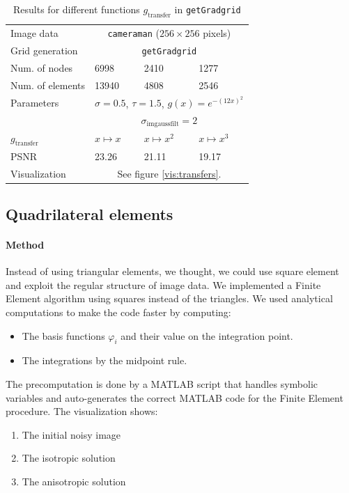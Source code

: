 \documentclass{report}
\renewcommand\phi{\varphi}
\begin{document}
\begin{table}[h]
	\centering
	\begin{tabular}{|llll}
		Image data & \multicolumn{3}{c}{\texttt{cameraman} ($256 \times 256$ pixels)} \\
		Grid generation & \multicolumn{3}{c}{\texttt{getGradgrid}} \\
		Num. of nodes & 6998 & 2410 & 1277 \\
		Num. of elements & 13940 & 4808 & 2546 \\
		Parameters & \multicolumn{3}{c}{$\sigma=0.5$, $\tau=1.5$, $g(x) = e^{-(12 x)^2}$} \\
		& \multicolumn{3}{c}{$\sigma_\text{imgaussfilt}=2$} \\
		$g_\text{transfer}$ & $x \mapsto x$ & $x \mapsto x^2$ & $x \mapsto x^3$ \\
		PSNR & 23.26 & 21.11 & 19.17 \\
		Visualization &  \multicolumn{3}{c}{See figure \ref{vis:transfers}.} \\
	\end{tabular}
	\caption{Results for different functions $g_\text{transfer}$ in \texttt{getGradgrid}}
	\label{res:transfers}
\end{table}

\subsection{Quadrilateral elements}

\paragraph{Method}

Instead of using triangular elements, we thought, we could use square element and exploit the regular structure of image data. We implemented a Finite Element algorithm using squares instead of the triangles. We used analytical computations to make the code faster by computing: 

\begin{itemize}
    \item 
    The basis functions $\phi_i$ and their value on the integration point.
    \item 
    The integrations by the midpoint rule.
\end{itemize}
The precomputation is done by a MATLAB script that handles symbolic variables and auto-generates the correct MATLAB code for the Finite Element procedure. The visualization shows: 
\begin{enumerate}
\item 
The initial noisy image
\item 
The isotropic solution 
\item 
The anisotropic solution
\end{enumerate}
\end{document}
